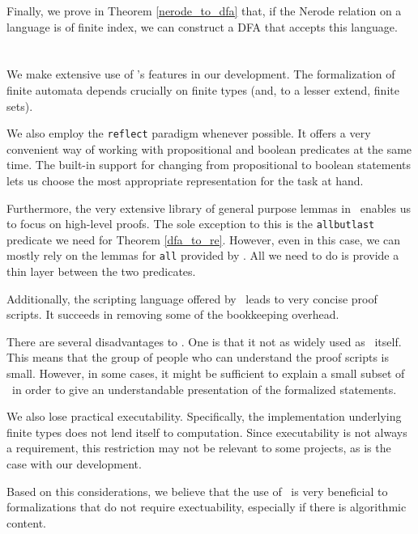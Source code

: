 Finally, we prove in Theorem \ref{nerode_to_dfa} that, if the Nerode relation on a language is of finite index, we can construct a DFA that accepts this language.

\section{\ssreflect}
We make extensive use of \ssreflect's features in our development.
The formalization of finite automata depends crucially on finite types (and, to a lesser extend, finite sets).

We also employ the \lstinline{reflect} paradigm whenever possible.
It offers a very convenient way of working with propositional and boolean predicates at the same time.
The built-in support for changing from propositional to boolean statements lets us choose the most appropriate representation for the task at hand.


Furthermore, the very extensive library of general purpose lemmas in \ssreflect\ enables us to focus on high-level proofs. 
The sole exception to this is the \lstinline{allbutlast} predicate we need for Theorem \ref{dfa_to_re}.
However, even in this case, we can mostly rely on the lemmas for \lstinline{all} provided by \ssreflect.
All we need to do is provide a thin layer between the two predicates.

Additionally, the scripting language offered by \ssreflect\ leads to very concise proof scripts. 
It succeeds in removing some of the bookkeeping overhead. %

There are several disadvantages to \ssreflect. 
One is that it not as widely used as \coq\ itself. 
This means that the group of people who can understand the 
proof scripts is small.
However, in some cases, it might be sufficient to explain a small subset of
\ssreflect\ in order to give an understandable presentation of the formalized statements. 

We also lose practical executability. 
Specifically, the implementation underlying finite types does not lend itself to computation. 
Since executability is not always a requirement, this restriction may not be relevant to some projects, as is the case with our development.

Based on this considerations, we believe that the use of \ssreflect\ is very beneficial to formalizations that do not require exectuability, especially if there is algorithmic content. 

